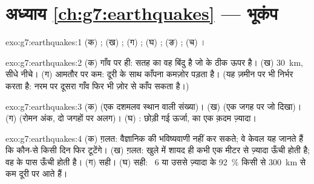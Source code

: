 \section*{अध्याय \ref{ch:g7:earthquakes} --- भूकंप}

\begin{solution}{exo:g7:earthquakes:1}
(क) ; (ख) ; (ग) ; (घ) ; (ङ) ; (च)
।
\end{solution}

\begin{solution}{exo:g7:earthquakes:2}
(क) गाँव पर ही:  सतह का वह बिंदु है जो  के ठीक ऊपर है।
(ख) \qty{30}{km}, सीधे नीचे। (ग) आमतौर पर कम: दूरी के साथ काँपना कमज़ोर पड़ता है।
(यह ज़मीन पर भी निर्भर करता है: नरम  पर दूसरा गाँव फिर भी ज़ोर से काँप
सकता है।)
\end{solution}

\begin{solution}{exo:g7:earthquakes:3}
(क)  (एक दशमलव स्थान वाली संख्या)। (ख)  (एक जगह पर जो दिखा)।
(ग)  (रोमन अंक, दो जगहों पर अलग)। (घ) : छोड़ी गई ऊर्जा,  का एक
क़दम ज़्यादा।
\end{solution}

\begin{solution}{exo:g7:earthquakes:4}
(क) ग़लत: वैज्ञानिक  की भविष्यवाणी नहीं कर सकते; वे केवल यह जानते हैं कि
कौन-से  किसी दिन फिर टूटेंगे। (ख) ग़लत: खुले  में  शायद ही कभी
एक मीटर से ज़्यादा ऊँची होती है; वह  के पास ऊँची होती है। (ग) सही। (घ) सही:
~6 या उससे ज़्यादा के 92~\%  किसी  से
\qty{300}{km} से कम दूरी पर आते हैं।
\end{solution}

